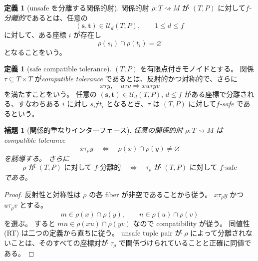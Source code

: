 \documentclass[10pt,a4paper]{ltjsarticle}
\newtheorem{lemma}[theorem]{補題}
\theoremstyle{definition}
\newtheorem{definition}[theorem]{定義}
\theoremstyle{remark}
\newcommand{\relto}{\mathrel{\rightsquigarrow}}
\begin{document}
\begin{definition}[unsafe を分離する関係的射]
\label{alg:def:rel-separating}
関係的射 $\rho:T\relto M$ が $(T,P)$ に対して\emph{$f$-分離的}であるとは、任意の
\[
(\mathbf s,\mathbf t)\in\mathcal U_d(T,P),
\qquad 1\le d\le f
\]
に対して、ある座標 $i$ が存在し
\[
\rho(s_i)\cap\rho(t_i)=\varnothing
\]
となることをいう。
\end{definition}

\begin{definition}[safe compatible tolerance]
\label{alg:def:safe-tolerance}
$(T,P)$ を有限点付きモノイドとする。
関係 $\tau\subseteq T\times T$ が\emph{compatible tolerance} であるとは、反射的かつ対称的で、さらに
\[
x\tau y,
\quad
u\tau v
\Longrightarrow
xu\tau yv
\]
を満たすことをいう。
任意の
$(\mathbf s,\mathbf t)\in\mathcal U_d(T,P)$, $d\le f$
がある座標で分離される、すなわちある $i$ に対し
$s_i\not\tau t_i$
となるとき、$\tau$ は $(T,P)$ に対して\emph{$f$-safe} であるという。
\end{definition}

\begin{lemma}[関係的重なりインターフェース]
\label{alg:lem:relational-overlap}
任意の関係的射 $\rho:T\relto M$ は compatible tolerance
\[
x\tau_\rho y
\quad\Longleftrightarrow\quad
\rho(x)\cap\rho(y)\ne\varnothing
\tag{T}
\]
を誘導する。
さらに
\[
\rho\text{ が }(T,P)\text{ に対して }f\text{-分離的}
\quad\Longleftrightarrow\quad
\tau_\rho\text{ が }(T,P)\text{ に対して }f\text{-safe}
\tag{RT}
\]
である。
\end{lemma}

\begin{proof}
反射性と対称性は $\rho$ の各 fiber が非空であることから従う。
$x\tau_\rho y$ かつ $u\tau_\rho v$ とする。
\[
m\in\rho(x)\cap\rho(y),
\qquad
n\in\rho(u)\cap\rho(v)
\]
を選ぶ。
すると
$mn\in\rho(xu)\cap\rho(yv)$
なので compatibility が従う。
同値性 \textup{(RT)} は二つの定義から直ちに従う。
unsafe tuple pair が $\rho$ によって分離されないことは、そのすべての座標対が $\tau_\rho$ で関係づけられていることと正確に同値である。
\end{proof}
\end{document}
